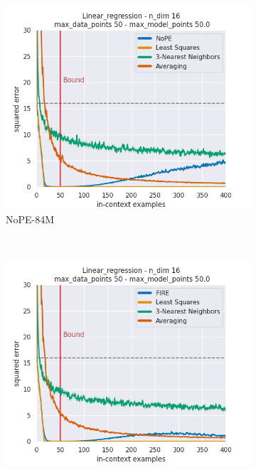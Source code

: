 \documentclass[letterpaper]{article} %
\begin{document}
\begin{figure}[tp]
\begin{subfigure}[t]{0.32\linewidth}
    \end{subfigure}
    \begin{subfigure}[t]{0.32\linewidth}
        \includegraphics[width=\linewidth]{AnonymousSubmission/LaTeX/imgs/analysis/large-nope.png}
        \caption{NoPE-84M}
    \end{subfigure}
    \\
    \begin{subfigure}[t]{0.32\linewidth}
        \includegraphics[width=\linewidth]{AnonymousSubmission/LaTeX/imgs/analysis/small-fire.png}

\end{subfigure}
\end{figure}
\end{document}
